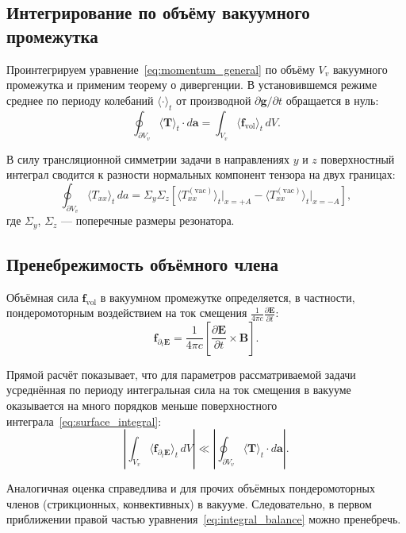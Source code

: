 \documentclass[a4paper,10pt]{article}
\newcommand{\modblock}[1]{\colorbox{modcolor!10}{\parbox{\dimexpr\linewidth-2\fboxsep}{#1}}}
\begin{document}
{\subsection{Интегрирование по объёму вакуумного промежутка}

Проинтегрируем уравнение~\eqref{eq:momentum_general} по объёму $V_v$ вакуумного промежутка и применим теорему о дивергенции. В установившемся режиме среднее по периоду колебаний $\langle \cdot \rangle_t$ от производной $\partial \mathbf{g}/\partial t$ обращается в нуль:
\begin{equation}
\label{eq:integral_balance}
\oint_{\partial V_v} \langle \mathbf{T} \rangle_t \cdot d\mathbf{a}
= \int_{V_v} \langle \mathbf{f}_{\mathrm{vol}} \rangle_t \, dV.
\end{equation}

В силу трансляционной симметрии задачи в направлениях $y$ и $z$ поверхностный интеграл сводится к разности нормальных компонент тензора на двух границах:
\begin{equation}
\label{eq:surface_integral}
\oint_{\partial V_v} \langle T_{xx} \rangle_t \, da
= \Sigma_y \Sigma_z \left[
\langle T_{xx}^{(\mathrm{vac})} \rangle_t \Big|_{x=+A}
- \langle T_{xx}^{(\mathrm{vac})} \rangle_t \Big|_{x=-A}
\right],
\end{equation}
где $\Sigma_y$, $\Sigma_z$ --- поперечные размеры резонатора.

\subsection{Пренебрежимость объёмного члена}

Объёмная сила $\mathbf{f}_{\mathrm{vol}}$ в вакуумном промежутке определяется, в частности, пондеромоторным воздействием на ток смещения $\frac{1}{4\pi c}\frac{\partial \mathbf{E}}{\partial t}$:
\begin{equation}
\label{eq:f_displacement}
\mathbf{f}_{\partial_t \mathbf{E}} = \frac{1}{4\pi c}
\left[ \frac{\partial \mathbf{E}}{\partial t} \times \mathbf{B} \right].
\end{equation}

Прямой расчёт показывает, что для параметров рассматриваемой задачи усреднённая по периоду интегральная сила на ток смещения в вакууме оказывается на много порядков меньше поверхностного интеграла~\eqref{eq:surface_integral}:
\begin{equation}
\label{eq:displacement_small}
\left| \int_{V_v} \langle \mathbf{f}_{\partial_t \mathbf{E}} \rangle_t \, dV \right|
\ll
\left| \oint_{\partial V_v} \langle \mathbf{T} \rangle_t \cdot d\mathbf{a} \right|.
\end{equation}

Аналогичная оценка справедлива и для прочих объёмных пондеромоторных членов (стрикционных, конвективных) в вакууме. Следовательно, в первом приближении правой частью уравнения~\eqref{eq:integral_balance} можно пренебречь.

} %
\end{document}
